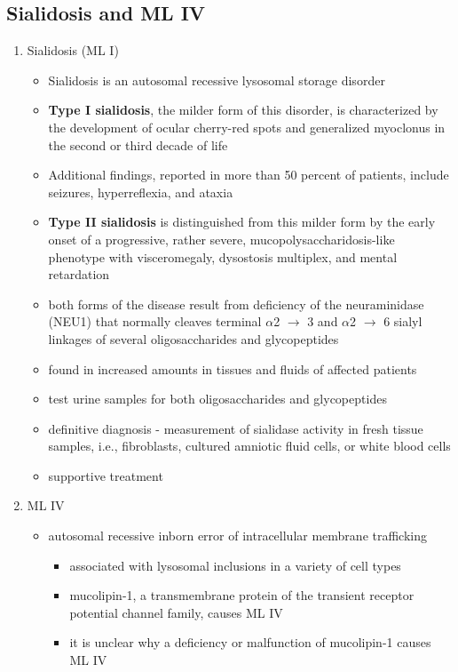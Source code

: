 \documentclass{scrartcl}
\begin{document}
\subsection{Sialidosis and ML IV}
\label{sec:org663732d}

\begin{enumerate}
\item Sialidosis (ML I)
\label{sec:orgb72509b}
\begin{itemize}
\item Sialidosis is an autosomal recessive lysosomal storage disorder

\item \textbf{Type I sialidosis}, the milder form of this disorder, is
characterized by the development of ocular cherry-red spots and
generalized myoclonus in the second or third decade of life
\item Additional findings, reported in more than 50 percent of patients,
include seizures, hyperreflexia, and ataxia

\item \textbf{Type II sialidosis} is distinguished from this milder form by the
early onset of a progressive, rather severe,
mucopolysaccharidosis-like phenotype with visceromegaly, dysostosis
multiplex, and mental retardation

\item both forms of the disease result from deficiency of the
neuraminidase (NEU1) that normally cleaves terminal \(\alpha\)2 \(\to\) 3 and
\(\alpha\)2 \(\to\) 6 sialyl linkages of several oligosaccharides and glycopeptides

\item found in increased amounts in tissues and fluids of affected patients

\item test urine samples for both oligosaccharides and glycopeptides

\item definitive diagnosis - measurement of sialidase activity in fresh tissue
samples, i.e., fibroblasts, cultured amniotic fluid cells, or white
blood cells

\item supportive treatment
\end{itemize}

\item ML IV
\label{sec:org229c08b}

\begin{itemize}
\item autosomal recessive inborn error of intracellular membrane trafficking
\begin{itemize}
\item associated with lysosomal inclusions in a variety of cell types
\item mucolipin-1, a transmembrane protein of the transient receptor
potential channel family, causes ML IV
\item it is unclear why a deficiency or malfunction of mucolipin-1 causes ML IV
\end{itemize}


\end{itemize}
\end{enumerate}
\end{document}
